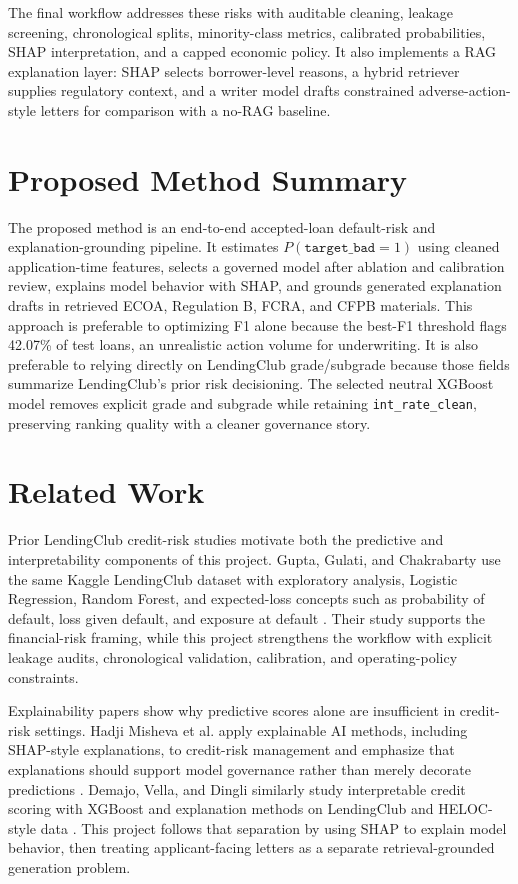 \documentclass[11pt]{article}
\begin{document}
The final workflow addresses these risks with auditable cleaning, leakage screening, chronological splits, minority-class metrics, calibrated probabilities, SHAP interpretation, and a capped economic policy. It also implements a RAG explanation layer: SHAP selects borrower-level reasons, a hybrid retriever supplies regulatory context, and a writer model drafts constrained adverse-action-style letters for comparison with a no-RAG baseline.

\section{Proposed Method Summary}
The proposed method is an end-to-end accepted-loan default-risk and explanation-grounding pipeline. It estimates $P(\texttt{target\_bad}=1)$ using cleaned application-time features, selects a governed model after ablation and calibration review, explains model behavior with SHAP, and grounds generated explanation drafts in retrieved ECOA, Regulation B, FCRA, and CFPB materials. This approach is preferable to optimizing F1 alone because the best-F1 threshold flags 42.07\% of test loans, an unrealistic action volume for underwriting. It is also preferable to relying directly on LendingClub grade/subgrade because those fields summarize LendingClub's prior risk decisioning. The selected neutral XGBoost model removes explicit grade and subgrade while retaining \texttt{int\_rate\_clean}, preserving ranking quality with a cleaner governance story.

\section{Related Work}
Prior LendingClub credit-risk studies motivate both the predictive and interpretability components of this project. Gupta, Gulati, and Chakrabarty use the same Kaggle LendingClub dataset with exploratory analysis, Logistic Regression, Random Forest, and expected-loss concepts such as probability of default, loss given default, and exposure at default \cite{gupta2022}. Their study supports the financial-risk framing, while this project strengthens the workflow with explicit leakage audits, chronological validation, calibration, and operating-policy constraints.

Explainability papers show why predictive scores alone are insufficient in credit-risk settings. Hadji Misheva et al. apply explainable AI methods, including SHAP-style explanations, to credit-risk management and emphasize that explanations should support model governance rather than merely decorate predictions \cite{misheva2021}. Demajo, Vella, and Dingli similarly study interpretable credit scoring with XGBoost and explanation methods on LendingClub and HELOC-style data \cite{demajo2020}. This project follows that separation by using SHAP to explain model behavior, then treating applicant-facing letters as a separate retrieval-grounded generation problem.
\end{document}
